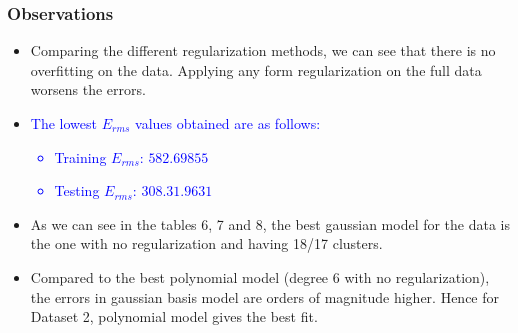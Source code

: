 \documentclass[12pt,a4paper]{article}
\newcommand{\noi}{\noindent}
\begin{document}
\subsubsection{Observations}
\begin{itemize}
    \item 
Comparing the different regularization methods, we can see that there is no overfitting on the data. Applying any form regularization on the full data worsens the errors. \\
\item \noi
\textcolor{blue}{The lowest $E_{rms}$ values obtained are as follows:
\begin{itemize}
    \itemsep0em
    \item Training $E_{rms}$: $582.69855$
    \item Testing $E_{rms}$: $308.31.9631$
\end{itemize}
}
\item As we can see in the tables 6, 7 and 8, the best gaussian model for the data is the one with no regularization and having 18/17 clusters.
\item Compared to the best polynomial model (degree 6 with no regularization), the errors in gaussian basis model are orders of magnitude higher. Hence for Dataset 2, polynomial model gives the best fit.
\end{itemize}
\end{document}
